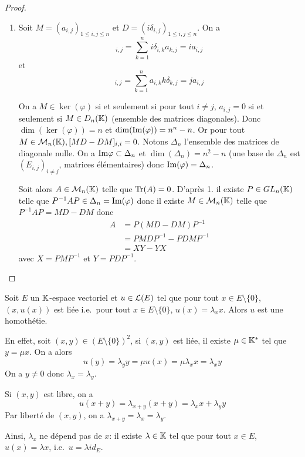 \begin{proof}
\begin{enumerate}
        \item Soit $M=(a_{i,j})_{1\leqslant i,j\leqslant n}$ et $D=(i\delta_{i,j})_{1\leqslant i,j\leqslant n}$. On a 
        \begin{equation}
            [DM]_{i,j}=\sum_{k=1}^{n}i\delta_{i,k}a_{k,j}=ia_{i,j}
        \end{equation}
        et 
        \begin{equation}
            [MD]_{i,j}=\sum_{k=1}^{n}a_{i,k}k\delta_{k,j}=ja_{i,j}
        \end{equation}

        On a $M\in\ker(\varphi)$ si et seulement si pour tout $i\neq j$, $a_{i,j}=0$ si et seulement si $M\in D_{n}(\mathbb{K})$ (ensemble des matrices diagonales). Donc $\dim(\ker(\varphi))=n$ et $\dim(\mathrm{Im}(\varphi))=n^{n}-n$. Or pour tout $M\in \mathcal{M}_{n}(\mathbb{K}), [MD-DM]_{i,i}=0$. Notons $\Delta_{n}$ l'ensemble des matrices de diagonale nulle. On a $\mathrm{Im}\varphi\subset\Delta_{n}$ et $\dim(\Delta_{n})=n^{2}-n$ (une base de $\Delta_{n}$ est $(E_{i,j})_{i\neq j}$, matrices élémentaires) donc $\mathrm{Im}(\varphi)=\Delta_{n}$.

        Soit alors $A\in\mathcal{M}_{n}(\mathbb{K})$ telle que $\operatorname{Tr}(A)=0$. D'après 1. il existe $P\in GL_{n}(\mathbb{K})$ telle que $P^{-1}AP\in\Delta_{n}=\mathrm{Im}(\varphi)$ donc il existe $M\in\mathcal{M}_{n}(\mathbb{K})$ telle que $P^{-1}AP=MD-DM$ donc 
        \begin{align}
            A
            &=P(MD-DM)P^{-1}\\
            &=PM DP^{-1}-PD MP^{-1}\\
            &=\boxed{XY-YX}
        \end{align}
        avec $X=PMP^{-1}$ et $Y=PDP^{-1}$.
    \end{enumerate}
\end{proof}

\begin{remark}
    Soit $E$ un $\mathbb{K}$-espace vectoriel et $u\in\mathcal{L}(E)$ tel que pour tout $x\in E\setminus\lbrace0\rbrace$, $(x,u(x))$ est liée i.e.~pour tout $x\in E\setminus\lbrace0\rbrace$, $u(x)=\lambda_{x}x$. Alors $u$ est une homothétie.

    En effet, soit $(x,y)\in\left(E\setminus\lbrace0\rbrace\right)^{2}$, si $(x,y)$ est liée, il existe $\mu\in\mathbb{K}^{*}$ tel que $y=\mu x$. On a alors 
    \begin{equation}
        u(y)=\lambda_{y}y=\mu u(x)=\mu\lambda_{x}x=\lambda_{x}y
    \end{equation}
    On a $y\neq0$ donc $\lambda_{x}=\lambda_{y}$.

    Si $(x,y)$ est libre, on a
    \begin{equation}
        u(x+y)=\lambda_{x+y}(x+y)=\lambda_{x}x+\lambda_{y}y
    \end{equation}
    Par liberté de $(x,y)$, on a $\lambda_{x+y}=\lambda_{x}=\lambda_{y}$. 
    
    Ainsi, $\lambda_{x}$ ne dépend pas de $x$: il existe $\lambda\in\mathbb{K}$ tel que pour tout $x\in E$, $u(x)=\lambda x$, i.e.~$u=\lambda id_{E}$.
\end{remark}

